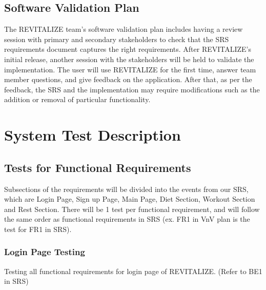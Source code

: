 \documentclass[12pt, titlepage]{article}
\begin{document}
\subsection{Software Validation Plan}




The REVITALIZE team's software validation plan includes having a review session with primary and secondary stakeholders to check that the SRS requirements document captures the right requirements. After REVITALIZE's initial release, another session with the stakeholders will be held to validate the implementation. The user will use REVITALIZE for the first time, answer team member questions, and give feedback on the application. After that, as per the feedback, the SRS and the implementation may require modifications such as the addition or removal of particular functionality.

\section{System Test Description}

\subsection{Tests for Functional Requirements}

Subsections of the requirements will be divided into the events from our SRS, which are Login Page, Sign up Page, Main Page, Diet Section, Workout Section and Rest Section. There will be 1 test per functional requirement, and will follow the same order as functional requirements in SRS (ex. FR1 in VnV plan is the test for FR1 in SRS).

\subsubsection{Login Page Testing}

Testing all functional requirements for login page of REVITALIZE. (Refer to BE1 in SRS)
\end{document}
